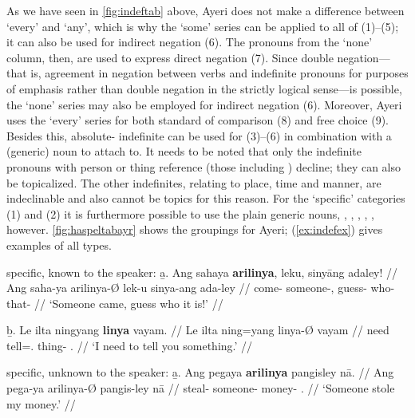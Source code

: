 As we have seen in \autoref{fig:indeftab} above, Ayeri does not make a
difference between `every' and `any', which is why the `some' series can be
applied to all of (1)--(5); it can also be used for indirect negation (6). The
pronouns from the `none' column, then, are used to express direct negation (7).
Since double negation---that is, agreement in negation between verbs and
indefinite pronouns for purposes of emphasis rather than double negation in the
strictly logical sense---is possible, the `none' series may also be employed
for indirect negation (6). Moreover, Ayeri uses the `every' series for both
standard of comparison (8) and free choice (9). Besides this, absolute-
indefinite  can be used for (3)--(6) in combination with a
(generic) noun to attach to. It needs to be noted that only the indefinite
pronouns with person or thing reference (those including )
decline; they can also be topicalized. The other indefinites, relating to
place, time and manner, are indeclinable and also cannot be topics for this
reason.
%
%
For the `specific' categories (1) and (2) it is furthermore possible to use the
plain generic nouns, , ,
, , , 
however. \autoref{fig:haspeltabayr} shows the groupings for Ayeri; 
(\ref{ex:indefex}) gives examples of all types.

\pex[labeltype=numeric,interpartskip=1em]\label{ex:indefex}
\a specific, known to the speaker:\vspace{.5em} %
	\beginsubsub
	\b{a.} \begingl
		\gla Ang sahaya \textbf{arilinya}, leku, sinyāng adaley! //
		\glb Ang saha-ya arilinya-Ø lek-u sinya-ang ada-ley //
		\glc \AgtT{} come-\TsgM{} someone-\Top{}, guess-\Imp{} 
			who-\Aarg{} that-\PargI{} //
		\glft `Someone came, guess who it is!' //
		\endgl\vspace{.5em}
		
	\b{b.} \begingl
		\gla Le ilta ningyang \textbf{linya} vayam. //
		\glb Le ilta ning=yang linya-Ø vayam //
		\glc \PatTI{} need tell=\Fsg{}.\Aarg{} thing-\Top{} 
			\Ssg{}.\Dat{} //
		\glft `I need to tell you something.' //
		\endgl
	\endsubsub

\a specific, unknown to the speaker:\vspace{.5em} %
	\beginsubsub
	\b{a.} \begingl
		\gla Ang pegaya \textbf{arilinya} pangisley nā. //
		\glb Ang pega-ya arilinya-Ø pangis-ley nā //
		\glc \AgtT{} steal-\TsgM{} someone-\Top{} money-\PargI{} 
			\Fsg{}.\Gen{} //
		\glft `Someone stole my money.' //
		\endgl\vspace{.5em}
		
